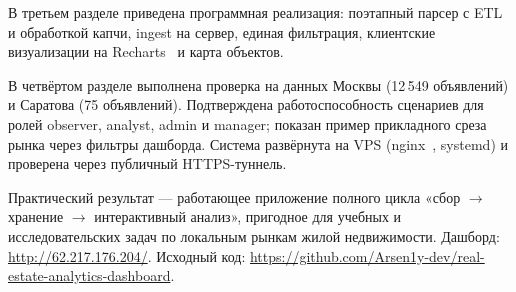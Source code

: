 \documentclass[coursework]{SCWorks}
\begin{document}
В третьем разделе приведена программная реализация: поэтапный парсер с ETL и обработкой капчи, ingest на сервер, единая фильтрация, клиентские визуализации на Recharts~\cite{recharts} и карта объектов.

В четвёртом разделе выполнена проверка на данных Москвы (12\,549 объявлений) и Саратова (75 объявлений). Подтверждена работоспособность сценариев для ролей observer, analyst, admin и manager; показан пример прикладного среза рынка через фильтры дашборда. Система развёрнута на VPS (nginx~\cite{nginx}, systemd) и проверена через публичный HTTPS-туннель.

Практический результат --- работающее приложение полного цикла «сбор $\rightarrow$ хранение $\rightarrow$ интерактивный анализ», пригодное для учебных и исследовательских задач по локальным рынкам жилой недвижимости. Дашборд: \url{http://62.217.176.204/}. Исходный код: \url{https://github.com/Arsen1y-dev/real-estate-analytics-dashboard}.




\appendix

\end{document}
